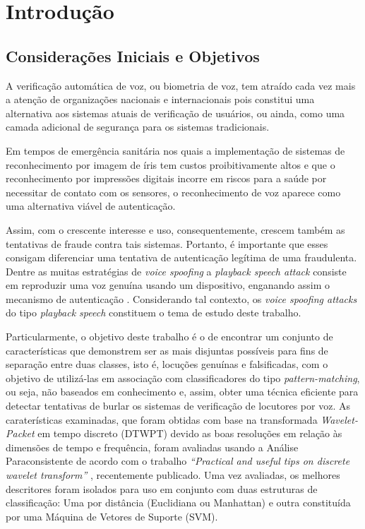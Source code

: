 \chapter{Introdução}
	\section{Considerações Iniciais e Objetivos}
		\par A verificação automática de voz, ou biometria de voz, tem atraído cada vez mais a atenção de organizações nacionais e internacionais pois constitui uma alternativa aos sistemas atuais de verificação de usuários, ou ainda, como uma camada adicional de segurança para os sistemas tradicionais. 
		
		\par Em tempos de emergência sanitária nos quais a implementação de sistemas de reconhecimento por imagem de íris tem custos proibitivamente altos e que o reconhecimento por impressões digitais incorre em riscos para a saúde por necessitar de contato com os sensores, o reconhecimento de voz aparece como uma alternativa viável de autenticação.		
		
		\par Assim, com o crescente interesse e uso, consequentemente, crescem também as tentativas de fraude contra tais sistemas. Portanto, é importante que esses consigam diferenciar uma tentativa de autenticação legítima de uma fraudulenta. Dentre as muitas estratégias de \textit{voice spoofing} a \textit{playback speech attack} consiste em reproduzir uma voz genuína usando um dispositivo, enganando assim o mecanismo de autenticação \cite{vs2}\cite{dsp3}\cite{dsp4}. Considerando tal contexto, os \textit{voice spoofing attacks} do tipo \textit{playback speech} constituem o tema de estudo deste trabalho. 

		\par Particularmente, o objetivo deste trabalho é o de encontrar um conjunto de características que demonstrem ser as mais disjuntas possíveis para fins de separação entre duas classes, isto é, locuções genuínas e falsificadas, com o objetivo de utilizá-las em associação com classificadores do tipo \textit{pattern-matching}, ou seja, não baseados em conhecimento e, assim, obter uma técnica eficiente para detectar tentativas de burlar os sistemas de verificação de locutores por voz. As caraterísticas examinadas, que foram obtidas com base na transformada \textit{Wavelet-Packet} em tempo discreto (DTWPT) devido as boas resoluções em relação às dimensões de tempo e frequência, foram avaliadas usando a Análise Paraconsistente de acordo com o trabalho \textit{``Practical and useful tips on discrete wavelet transform''} \cite{8588433}, recentemente publicado. Uma vez avaliadas, os melhores descritores foram isolados para uso em conjunto com duas estruturas de classificação: Uma por distância (Euclidiana ou Manhattan) e outra constituída por uma Máquina de Vetores de Suporte (SVM). 
		

